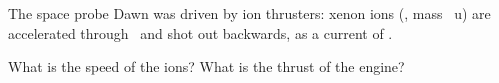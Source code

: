The space probe Dawn was driven by ion thrusters: xenon ions (, mass \AmO~u) are accelerated through \UO\ and shot out backwards, as a current of \IO.

\begin{abcliste}
\abc What is the speed of the ions?
\abc What is the thrust of the engine?
\end{abcliste}
